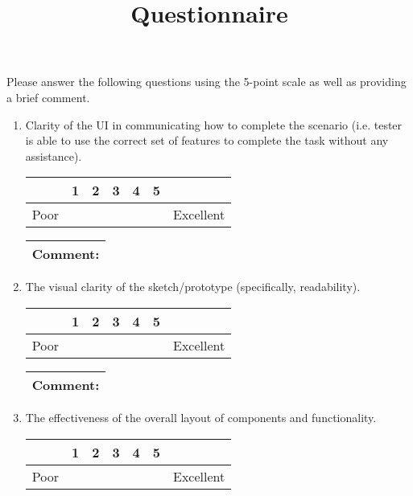 \documentclass[a4paper, parskip=half]{scrartcl}
\title{Questionnaire}
\date{}
\begin{document}
\maketitle

Please answer the following questions using the 5-point scale as well as providing
a brief comment.

\begin{enumerate}
  \item{
    Clarity of the UI in communicating how to complete the scenario (i.e. tester
    is able to use the correct set of features to complete the task without any
    assistance).

    \begin{tabularx}{\textwidth}{|X|C|C|C|C|C|X|}
       & 1 & 2 & 3 & 4 & 5 &  \\
      \hline
      Poor & & & & & & Excellent\\
      \hline
    \end{tabularx}

    \begin{tabularx}{\textwidth}{|X|}
      \hline
      \textbf{Comment:}\\[2cm]
      \hline
    \end{tabularx}
  }

  \item{
    The visual clarity of the sketch/prototype (specifically, readability).

    \begin{tabularx}{\textwidth}{|X|C|C|C|C|C|X|}
       & 1 & 2 & 3 & 4 & 5 &  \\
      \hline
      Poor & & & & & & Excellent\\
      \hline
    \end{tabularx}

    \begin{tabularx}{\textwidth}{|X|}
      \hline
      \textbf{Comment:}\\[2cm]
      \hline
    \end{tabularx}
  }

  \newpage
  \item{
    The effectiveness of the overall layout of components and functionality.

    \begin{tabularx}{\textwidth}{|X|C|C|C|C|C|X|}
       & 1 & 2 & 3 & 4 & 5 &  \\
      \hline
      Poor & & & & & & Excellent\\
      \hline
    \end{tabularx}

}
\end{enumerate}
\end{document}
